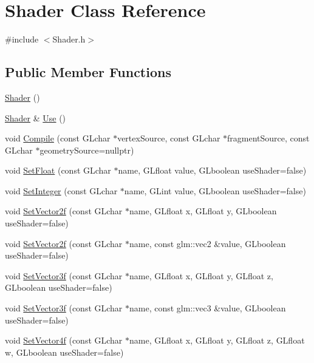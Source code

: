 \hypertarget{class_shader}{}\section{Shader Class Reference}
\label{class_shader}


{\ttfamily \#include $<$Shader.\+h$>$}

\subsection*{Public Member Functions}
\begin{DoxyCompactItemize}
\item 
\mbox{\hyperlink{class_shader_a0d654ebaca4e0555197c0724c6d30610}{Shader}} ()
\item 
\mbox{\hyperlink{class_shader}{Shader}} \& \mbox{\hyperlink{class_shader_a02292f4fdae284b29169db5da29e519a}{Use}} ()
\item 
void \mbox{\hyperlink{class_shader_a4d42d98a025018d7ce564a78ac5b921e}{Compile}} (const G\+Lchar $\ast$vertex\+Source, const G\+Lchar $\ast$fragment\+Source, const G\+Lchar $\ast$geometry\+Source=nullptr)
\item 
void \mbox{\hyperlink{class_shader_af08ebcd8cd00553bce2134a476187496}{Set\+Float}} (const G\+Lchar $\ast$name, G\+Lfloat value, G\+Lboolean use\+Shader=false)
\item 
void \mbox{\hyperlink{class_shader_a2c362029c73289761529a5d8b9d6a6b3}{Set\+Integer}} (const G\+Lchar $\ast$name, G\+Lint value, G\+Lboolean use\+Shader=false)
\item 
void \mbox{\hyperlink{class_shader_a6f0213e1a40b9ee631f4154da22f6f52}{Set\+Vector2f}} (const G\+Lchar $\ast$name, G\+Lfloat x, G\+Lfloat y, G\+Lboolean use\+Shader=false)
\item 
void \mbox{\hyperlink{class_shader_ae4c81083a20b2790c15d9fbc8e8c7b38}{Set\+Vector2f}} (const G\+Lchar $\ast$name, const glm\+::vec2 \&value, G\+Lboolean use\+Shader=false)
\item 
void \mbox{\hyperlink{class_shader_ad7e3033cb0250e83bc118c0677ef678a}{Set\+Vector3f}} (const G\+Lchar $\ast$name, G\+Lfloat x, G\+Lfloat y, G\+Lfloat z, G\+Lboolean use\+Shader=false)
\item 
void \mbox{\hyperlink{class_shader_af564b9fd25379dafacba930fc414dae8}{Set\+Vector3f}} (const G\+Lchar $\ast$name, const glm\+::vec3 \&value, G\+Lboolean use\+Shader=false)
\item 
void \mbox{\hyperlink{class_shader_a9f0f5bf4f960f299e6d7f69ecc612474}{Set\+Vector4f}} (const G\+Lchar $\ast$name, G\+Lfloat x, G\+Lfloat y, G\+Lfloat z, G\+Lfloat w, G\+Lboolean use\+Shader=false)

\end{DoxyCompactItemize}

